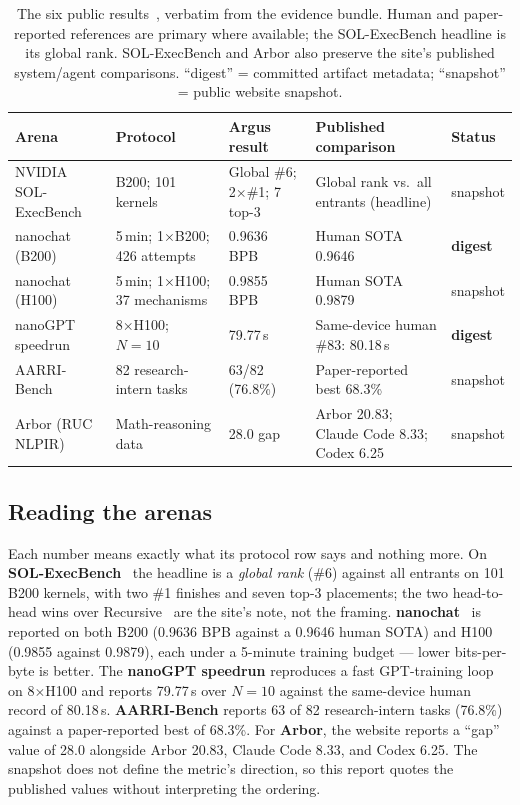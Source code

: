 \begin{table}[h]
\centering
\small
\begin{tabularx}{\linewidth}{@{}p{2.5cm} p{2.7cm} p{2.15cm} X p{1.55cm}@{}}
\toprule
\textbf{Arena} & \textbf{Protocol} & \textbf{Argus result} & \textbf{Published comparison} & \textbf{Status} \\
\midrule
NVIDIA SOL-ExecBench & B200; 101 kernels & Global \#6; 2$\times$\#1; 7 top-3 & Global rank vs.\ all entrants (headline) & snapshot \\
nanochat (B200) & 5\,min; 1$\times$B200; 426 attempts & 0.9636 BPB & Human SOTA 0.9646 & \textbf{digest} \\
nanochat (H100) & 5\,min; 1$\times$H100; 37 mechanisms & 0.9855 BPB & Human SOTA 0.9879 & snapshot \\
nanoGPT speedrun & 8$\times$H100; $N{=}10$ & 79.77\,s & Same-device human \#83: 80.18\,s & \textbf{digest} \\
AARRI-Bench & 82 research-intern tasks & 63/82 (76.8\%) & Paper-reported best 68.3\% & snapshot \\
Arbor (RUC NLPIR) & Math-reasoning data & 28.0 gap & Arbor 20.83; Claude Code 8.33; Codex 6.25 & snapshot \\
\bottomrule
\end{tabularx}
\caption{The six public results~\cite{argus_results}, verbatim from the evidence
bundle. Human and paper-reported references are primary where available; the
SOL-ExecBench headline is its global rank. SOL-ExecBench and Arbor also preserve
the site's published system/agent comparisons. ``digest'' = committed artifact
metadata; ``snapshot'' = public website snapshot.}
\label{tab:results}
\end{table}

\subsection{Reading the arenas}

Each number means exactly what its protocol row says and nothing more. On
\textbf{SOL-ExecBench}~\cite{ouyang2025kernelbench} the headline is a \emph{global rank} (\#6) against all
entrants on 101 B200 kernels, with two \#1 finishes and seven top-3 placements;
the two head-to-head wins over Recursive~\cite{recursive2026firststeps} are the
site's note, not the framing. \textbf{nanochat}~\cite{karpathy_nanochat} is reported on both B200 (0.9636
BPB against a 0.9646 human SOTA) and H100 (0.9855 against 0.9879), each under a
5-minute training budget --- lower bits-per-byte is better. The \textbf{nanoGPT
speedrun} reproduces a fast GPT-training loop~\cite{karpathy_nanogpt} on
8$\times$H100 and reports 79.77\,s over $N{=}10$ against the same-device human
record of 80.18\,s. \textbf{AARRI-Bench} reports 63 of 82 research-intern tasks
(76.8\%) against a paper-reported best of 68.3\%. For \textbf{Arbor}, the website
reports a ``gap'' value of 28.0 alongside Arbor 20.83, Claude Code 8.33, and
Codex 6.25. The snapshot does not define the metric's direction, so this report
quotes the published values without interpreting the ordering.

